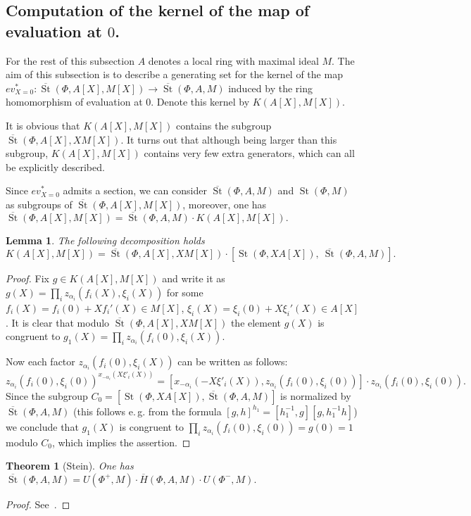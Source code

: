 \documentclass[oneside, 8pt]{amsart}
\newtheorem*{theorem*}{Theorem}
\newtheorem{lemma}{Lemma}
\theoremstyle{remark}
\theoremstyle{definition}
\numberwithin{lemma}{section}
\numberwithin{prop}{section}
\numberwithin{corollary}{section}
\DeclareMathOperator{\St}{St}
\numberwithin{equation}{section}
\begin{document}
\subsection{Computation of the kernel of the map of evaluation at \texorpdfstring{$0$}{0}.}
For the rest of this subsection $A$ denotes a local ring with maximal ideal $M$.
The aim of this subsection is to describe a generating set for the kernel of the map $ev_{X=0}^*\colon\overline{\St}(\Phi, A[X], M[X]) \to \overline{\St}(\Phi, A, M)$
induced by the ring homomorphism of evaluation at $0$. Denote this kernel by $K(A[X], M[X])$.

It is obvious that $K(A[X], M[X])$ contains the subgroup $\overline{\St}(\Phi, A[X], XM[X])$.
It turns out that although being larger than this subgroup, $K(A[X], M[X])$ contains very few extra generators, which can all be explicitly described.

Since $ev_{X=0}^*$ admits a section, we can consider $\overline{\St}(\Phi, A, M)$ and $\St(\Phi, M)$ as subgroups of $\overline{\St}(\Phi, A[X], M[X])$,
 moreover, one has $\overline{\St}(\Phi, A[X], M[X]) = \overline{\St}(\Phi, A, M) \cdot K(A[X], M[X]).$
\begin{lemma} The following decomposition holds
 \[ K(A[X], M[X]) = \overline{\St}(\Phi, A[X], XM[X]) \cdot \left[\St(\Phi, XA[X]),\ \overline{\St}(\Phi, A, M)\right].\] \end{lemma}
\begin{proof} Fix $g \in K(A[X], M[X])$ and write it as $g(X) = \prod_i z_{\alpha_i}(f_i(X), \xi_i(X))$ for some $f_i(X) = f_i(0) + Xf_i'(X) \in M[X]$, $\xi_i(X) = \xi_i(0) + X\xi_i'(X) \in A[X]$.
 It is clear that modulo $\overline{\St}(\Phi, A[X], XM[X])$ the element $g(X)$ is congruent to $g_1(X) = \prod_i z_{\alpha_i}(f_i(0), \xi_i(X)).$ 
 
 Now each factor $z_{\alpha_i}(f_i(0), \xi_i(X))$ can be written as follows:
 \[z_{\alpha_i}(f_i(0), \xi_i(0))^{x_{-\alpha_i}(X\xi'_i(X))} = [x_{-\alpha_i}(-X\xi'_i(X)), z_{\alpha_i}(f_i(0), \xi_i(0))] \cdot z_{\alpha_i}(f_i(0), \xi_i(0)).\]
 Since the subgroup $C_0 = \left[\St(\Phi, XA[X]), \overline{\St}(\Phi, A, M)\right]$ is normalized by $\overline{\St}(\Phi, A, M)$ 
 (this follows e.\,g. from the formula $[g, h]^{h_1} = [h_1^{-1}, g][g, h_1^{-1}h]$) we conclude that $g_1(X)$ is congruent to $\prod_i z_{\alpha_i}(f_i(0), \xi_i(0)) = g(0) = 1$ modulo $C_0$,
 which implies the assertion. \qedhere \end{proof}

\begin{theorem*}[Stein] One has $\overline{\St}(\Phi, A, M) = U(\Phi^+, M) \cdot \overline{H}(\Phi, A, M) \cdot U(\Phi^-, M).$ \end{theorem*} \begin{proof} See~\cite[Theorem~2.4]{Ste73}. \end{proof}
\end{document}
